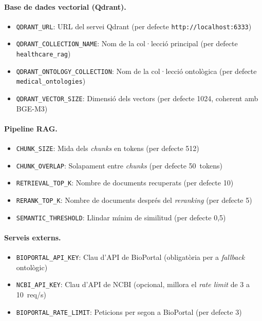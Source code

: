 \documentclass[CAT]{TFUOC}%
\begin{document}
\paragraph{Base de dades vectorial (Qdrant).}
\begin{itemize}
    \item \texttt{QDRANT\_URL}: URL del servei Qdrant (per defecte \texttt{http://localhost:6333})
    \item \texttt{QDRANT\_COLLECTION\_NAME}: Nom de la col·lecció principal (per defecte \texttt{healthcare\_rag})
    \item \texttt{QDRANT\_ONTOLOGY\_COLLECTION}: Nom de la col·lecció ontològica (per defecte \texttt{medical\_ontologies})
    \item \texttt{QDRANT\_VECTOR\_SIZE}: Dimensió dels vectors (per defecte 1024, coherent amb BGE-M3)
\end{itemize}

\paragraph{Pipeline RAG.}
\begin{itemize}
    \item \texttt{CHUNK\_SIZE}: Mida dels \textit{chunks} en tokens (per defecte 512)
    \item \texttt{CHUNK\_OVERLAP}: Solapament entre \textit{chunks} (per defecte 50~tokens)
    \item \texttt{RETRIEVAL\_TOP\_K}: Nombre de documents recuperats (per defecte 10)
    \item \texttt{RERANK\_TOP\_K}: Nombre de documents després del \textit{reranking} (per defecte 5)
    \item \texttt{SEMANTIC\_THRESHOLD}: Llindar mínim de similitud (per defecte 0,5)
\end{itemize}

\paragraph{Serveis externs.}
\begin{itemize}
    \item \texttt{BIOPORTAL\_API\_KEY}: Clau d'API de BioPortal (obligatòria per a \textit{fallback} ontològic)
    \item \texttt{NCBI\_API\_KEY}: Clau d'API de NCBI (opcional, millora el \textit{rate limit} de 3 a 10~req/s)
    \item \texttt{BIOPORTAL\_RATE\_LIMIT}: Peticions per segon a BioPortal (per defecte 3)
\end{itemize}
\end{document}
